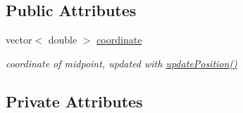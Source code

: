 \subsection*{Public Attributes}
\begin{DoxyCompactItemize}
\item 
vector$<$ double $>$ \hyperlink{classMotorGhost_ad67e83cfbc9157c0eda5139071ba98f6}{coordinate}
\begin{DoxyCompactList}\small\item\em coordinate of midpoint, updated with \hyperlink{classMotorGhost_af5160d203173a203b91bfe2e1461acf8}{update\+Position()} \end{DoxyCompactList}\end{DoxyCompactItemize}
\subsection*{Private Attributes}
